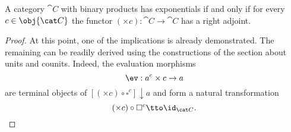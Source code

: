 \begin{proposition}
  A category \(\cat C\) with binary products has exponentials if and
  only if for every \(c \in \obj{\cat C}\) the functor
  \((\times c) : \cat C \to \cat C\) has a right adjoint. 
\end{proposition}

\begin{proof}
  At this point, one of the implications is already demonstrated. The
  remaining can be readily derived using the constructions of the
  section about units and counits.  Indeed, the evaluation morphisms
  \[\ev : a^c \times c \to a\]
  are terminal objects of
  \([(\times c) \circ \square^c] \downarrow a\) and form a natural transformation
  \[(\times c) \circ \square^c \tto \id_{\cat C} .\]  
\end{proof}


